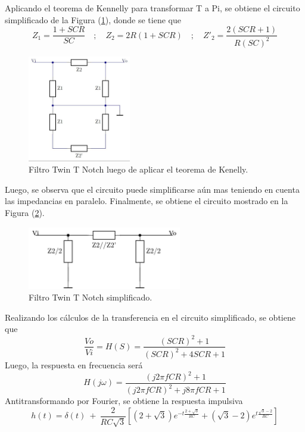 \documentclass[a4paper]{article}
\begin{document}
Aplicando el teorema de Kennelly para transformar T a Pi, se obtiene el circuito simplificado de la Figura (\ref{fig:filtrosimplificado}), donde se tiene que
\[Z_1=\frac{1+SCR}{SC}\hspace{1em};\hspace{1em} Z_2=2R(1+SCR) \hspace{1em};\hspace{1em} Z'_2=\frac{2(SCR+1)}{R(SC)^2}\]

\begin{figure}[H]
	\centering
	\includegraphics[width=0.4\textwidth, trim={0 0.1cm  0 0.1cm},clip]{ej1kennellly.jpg}
\caption{Filtro Twin T Notch luego de aplicar el teorema de Kenelly.}
	\label{fig:filtrosimplificado}
\end{figure}

Luego, se observa que el circuito puede simplificarse aún mas teniendo en cuenta las impedancias en paralelo. Finalmente, se obtiene el circuito mostrado en la Figura (\ref{fig:filtrofinal}).

\begin{figure}[H]
	\centering
	\includegraphics[width=0.6\textwidth]{ej1simplificado.jpg}
\caption{Filtro Twin T Notch simplificado.}
	\label{fig:filtrofinal}
\end{figure}

Realizando los cálculos de la transferencia en el circuito simplificado, se obtiene que
\begin{equation}
 \frac{Vo}{Vi}=H(S)=\frac{ \left( SCR \right)^2 + 1}{\left( SCR \right)^2 + 4SCR + 1}
 \label{equ:Hhdes}
\end{equation} 
Luego, la respuesta en frecuencia será
\begin{equation}
 H(j\omega)=\frac{ \left( j 2\pi f CR \right)^2 + 1}{\left( j 2\pi f CR \right)^2 + j 8\pi fCR + 1}
 \label{equ:Hdejomega}
\end{equation}
Antitransformando por Fourier, se obtiene la respuesta impulsiva
\begin{equation}
 h(t)=\delta \left( t \right) \ + \ \frac{2}{RC\sqrt{3}} \left[ \left( 2 + \sqrt{3} \right) e^{-t\frac{2 + \sqrt{3}}{RC}} + \left( \sqrt{3} - 2 \right) e^{t\frac{\sqrt{3} - 2}{RC}} \right]
 \label{equ:hdet}
\end{equation}
\end{document}
